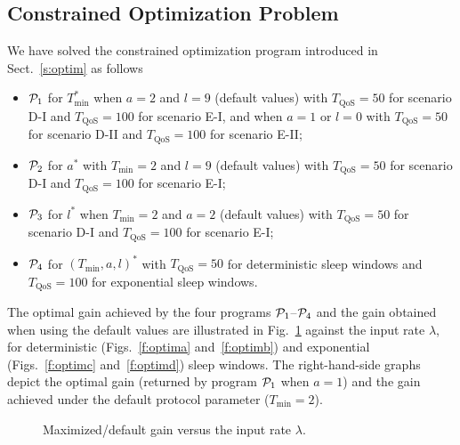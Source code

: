 \documentclass[journal]{IEEEtran}
\begin{document}
\subsection{Constrained Optimization Problem}
\label{s:ResOptim}
We have solved the constrained optimization program introduced in Sect.~\ref{s:optim} as follows
\begin{itemize}
\item ${\cal P}_1$ for $T_{\min}^*$ when $a=2$ and $l=9$ (default
values) with $T_{\textrm{QoS}}=50$ for scenario D-I and
$T_{\textrm{QoS}}=100$ for scenario E-I, and when $a=1$ or $l=0$ with
$T_{\textrm{QoS}}=50$ for scenario D-II and $T_{\textrm{QoS}}=100$ for
scenario E-II;
\item ${\cal P}_2$ for $a^*$ with $T_{\min}=2$ and $l=9$ (default
values) with $T_{\textrm{QoS}}=50$ for scenario D-I and
$T_{\textrm{QoS}}=100$ for scenario E-I;
\item ${\cal P}_3$ for $l^*$ when $T_{\min}=2$ and $a=2$ (default
values) with $T_{\textrm{QoS}}=50$ for scenario D-I and
$T_{\textrm{QoS}}=100$ for scenario E-I;
\item ${\cal P}_4$ for $(T_{\min},a,l)^*$ with $T_{\textrm{QoS}}=50$
for deterministic sleep windows and $T_{\textrm{QoS}}=100$ for exponential sleep windows.
\end{itemize}
The optimal gain achieved by the four programs ${\cal P}_1$--${\cal P}_4$ and the gain obtained when using the default values are illustrated in Fig.~\ref{f:optim} against the input rate $\lambda$, for deterministic (Figs.~\ref{f:optima} and~\ref{f:optimb}) and exponential (Figs.~\ref{f:optimc} and~\ref{f:optimd}) sleep windows. The right-hand-side graphs depict the optimal gain (returned by program ${\cal P}_1$ when $a=1$) and the gain achieved under the default protocol parameter ($T_{\min}=2$). 
\begin{figure}[tbh]
\begin{center}
\hspace{1em}
\hspace{1em}
\hspace{1em}
\caption{Maximized/default gain versus the input rate
$\lambda$.\label{f:optim}}
\end{center}
\end{figure}
\end{document}
